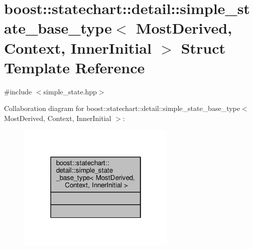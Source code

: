 \hypertarget{structboost_1_1statechart_1_1detail_1_1simple__state__base__type}{}\section{boost\+:\+:statechart\+:\+:detail\+:\+:simple\+\_\+state\+\_\+base\+\_\+type$<$ Most\+Derived, Context, Inner\+Initial $>$ Struct Template Reference}
\label{structboost_1_1statechart_1_1detail_1_1simple__state__base__type}


{\ttfamily \#include $<$simple\+\_\+state.\+hpp$>$}



Collaboration diagram for boost\+:\+:statechart\+:\+:detail\+:\+:simple\+\_\+state\+\_\+base\+\_\+type$<$ Most\+Derived, Context, Inner\+Initial $>$\+:
\nopagebreak
\begin{figure}[H]
\begin{center}
\leavevmode
\includegraphics[width=214pt]{structboost_1_1statechart_1_1detail_1_1simple__state__base__type__coll__graph}
\end{center}
\end{figure}
